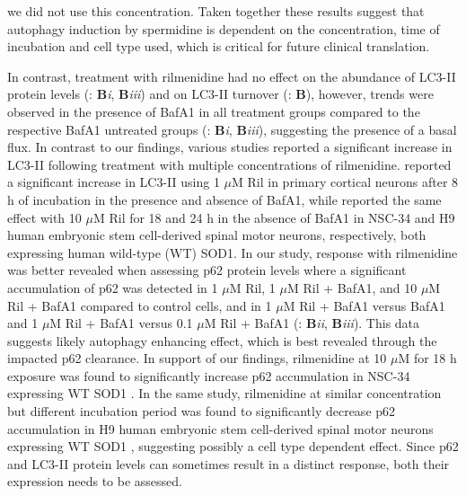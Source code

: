 we did not use this concentration. Taken together these results suggest that autophagy induction by spermidine is dependent on the concentration, time of incubation and cell type used, which is critical for future clinical translation.

In contrast, treatment with rilmenidine had no effect on the abundance of LC3-II protein levels (: \textbf{B}\textit{i}, \textbf{B}\textit{iii}) and on LC3-II turnover (: \textbf{B}), however, trends were observed in the presence of BafA1 in all treatment groups compared to the respective BafA1 untreated groups (: \textbf{B}\textit{i}, \textbf{B}\textit{iii}), suggesting the presence of a basal flux.  In contrast to our findings, various studies reported a significant increase in LC3-II following treatment with multiple concentrations of rilmenidine. \citet{Rose2010} reported a significant increase in LC3-II using 1 $\mu$M Ril in primary cortical neurons after 8 h of incubation in the presence and absence of BafA1, while \citet{Perera2018} reported the same effect with 10 $\mu$M Ril for 18 and 24 h  in the absence of BafA1 in NSC-34 and H9 human embryonic stem cell-derived spinal motor neurons, respectively, both expressing human wild-type (WT) SOD1. In our study, response with rilmenidine was better revealed when assessing p62 protein levels where a significant accumulation of p62 was detected in 1 $\mu$M Ril, 1 $\mu$M Ril + BafA1, and 10 $\mu$M Ril + BafA1 compared to control cells, and in 1 $\mu$M Ril + BafA1 versus BafA1 and 1 $\mu$M Ril + BafA1 versus 0.1 $\mu$M Ril + BafA1 (: \textbf{B}\textit{ii}, \textbf{B}\textit{iii}). This data suggests likely autophagy enhancing effect, which is best revealed through the impacted p62 clearance. In support of our findings, rilmenidine at 10 $\mu$M for 18 h exposure was found to significantly increase p62 accumulation in NSC-34 expressing WT SOD1 \citep{Perera2018}. In the same study, rilmenidine at similar concentration but different incubation period was found to significantly decrease p62 accumulation in H9 human embryonic stem cell-derived spinal motor neurons expressing WT SOD1  \citep{Perera2018}, suggesting possibly a cell type dependent effect. Since p62 and LC3-II protein levels can sometimes result in a distinct response, both their expression needs to be assessed.

